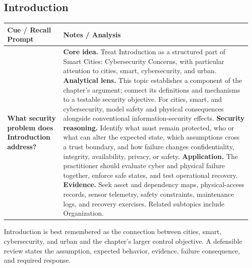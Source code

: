 \documentclass[11pt]{article}
\newcommand{\CornellHeader}{%
\rowcolor{Navy}\color{white}\bfseries Cue / Recall Prompt & \color{white}\bfseries Notes / Analysis\\\hline}
\newcommand{\CornellRow}[2]{%
\cellcolor{CueGray}\RaggedRight\textbf{#1} & \RaggedRight #2\\\hline}
\begin{document}
\subsection*{Introduction}
\begin{longtable}{>{\RaggedRight\arraybackslash}p{}|>{\RaggedRight\arraybackslash}p{}}
\CornellHeader
\CornellRow{What security problem does Introduction address?}{\textbf{Core idea.} Treat Introduction as a structured part of Smart Cities: Cybersecurity Concerns, with particular attention to cities, smart, cybersecurity, and urban. \textbf{Analytical lens.} This topic establishes a component of the chapter's argument; connect its definitions and mechanisms to a testable security objective. For cities, smart, and cybersecurity, model safety and physical consequences alongside conventional information-security effects. \textbf{Security reasoning.} Identify what must remain protected, who or what can alter the expected state, which assumptions cross a trust boundary, and how failure changes confidentiality, integrity, availability, privacy, or safety. \textbf{Application.} The practitioner should evaluate cyber and physical failure together, enforce safe states, and test operational recovery. \textbf{Evidence.} Seek asset and dependency maps, physical-access records, sensor telemetry, safety constraints, maintenance logs, and recovery exercises. Related subtopics include Organization.}
\end{longtable}
\begin{topicsummary}
Introduction is best remembered as the connection between cities, smart, cybersecurity, and urban and the chapter's larger control objective. A defensible review states the assumption, expected behavior, evidence, failure consequence, and required response.
\end{topicsummary}
\end{document}
